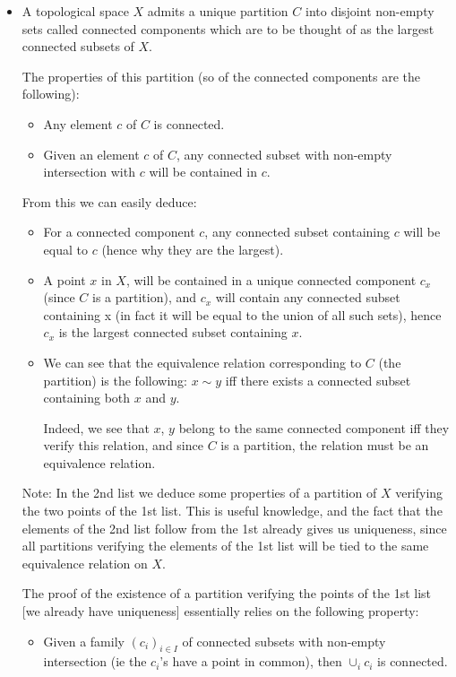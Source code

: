 \documentclass{report}
\theoremstyle{definition}
\begin{document}
\begin{itemize}
    \item A topological space $X$ admits a unique partition $C$ into disjoint non-empty sets called connected components which are to be thought of as the largest connected subsets of $X$.

    The properties of this partition (so of the connected components are the following):
    \begin{itemize}
        \item Any element $c$ of $C$ is connected.
        \item Given an element $c$ of $C$, any connected subset with non-empty intersection with $c$ will be contained in $c$.
    \end{itemize}

    From this we can easily deduce:
    \begin{itemize}
        \item For a connected component $c$, any connected subset containing $c$ will be equal to $c$ (hence why they are the largest).
        \item A point $x$ in $X$, will be contained in a unique connected component $c_x$ (since $C$ is a partition), and $c_x$ will contain any connected subset containing x (in fact it will be equal to the union of all such sets), hence $c_x$ is the largest connected subset containing $x$.
        \item We can see that the equivalence relation corresponding to $C$ (the partition) is the following: $x\sim y$ iff there exists a connected subset containing both $x$ and $y$.

        Indeed, we see that $x$, $y$ belong to the same connected component iff they verify this relation, and since $C$ is a partition, the relation must be an equivalence relation.
    \end{itemize}

    Note: In the 2nd list we deduce some properties of a partition of $X$ verifying the two points of the 1st list. This is useful knowledge, and the fact that the elements of the 2nd list follow from the 1st already gives us uniqueness, since all partitions verifying the elements of the 1st list will be tied to the same equivalence relation on $X$.

    The proof of the existence of a partition verifying the points of the 1st list [we already have uniqueness] essentially relies on the following property:
    \begin{itemize}
        \item Given a family $(c_i)_{i\in I}$ of connected subsets with non-empty intersection (ie the $c_i$'s have a point in common), then $\cup_i c_i$ is connected.


\end{itemize}
\end{itemize}
\end{document}
